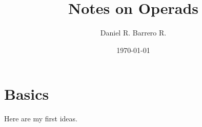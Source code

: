 \documentclass{amsart}
\title{Notes on Operads}
\author{Daniel R. Barrero R.}
\date{\today}
\begin{document}
\maketitle

\section{Basics}

Here are my first ideas.
\end{document}
